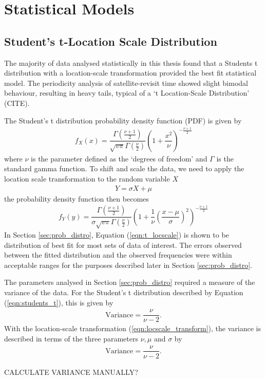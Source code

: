 \chapter{Statistical Models} \label{sec:stats}
\section{Student's t-Location Scale Distribution}
The majority of data analysed statistically in this thesis found that a Students t distribution with a location-scale transformation provided the best fit statistical model. The periodicity analysis of satellite-revisit time showed slight bimodal behaviour, resulting in heavy tails, typical of a `t Location-Scale Distribution' (CITE). 

The Student's t distribution probability density function (PDF) is given by
\begin{align}
	f_X(x) = \dfrac{\Gamma\left(\frac{\nu+ 1}{2}\right)}{\sqrt{v\pi} \Gamma \left(\frac{\nu}{2}\right)} \left( 1 + \dfrac{x^2}{\nu} \right) ^{-\frac{\nu + 1}{2}} \label{eqn:students_t}
\end{align}
where $\nu$ is the parameter defined as the `degrees of freedom' and $\Gamma$ is the standard gamma function. To shift and scale the data, we need to apply the location scale transformation to the random variable $X$
\begin{align}
	Y = \sigma X + \mu \label{eqn:locscale_transform}
\end{align}
the probability density function then becomes 
\begin{align}
	f_Y(y) = \dfrac{\Gamma\left(\frac{\nu+ 1}{2}\right)}{\sigma\sqrt{v\pi} \Gamma \left(\frac{\nu}{2}\right)} \left( 1 + \dfrac{1}{\nu} \left(\dfrac{x - \mu }{\sigma}\right)^2 \right) ^{-\frac{\nu + 1}{2}} \label{eqn:t_locscale}
\end{align}
In Section \ref{sec:prob_distro}, Equation (\ref{eqn:t_locscale}) is shown to be distribution of best fit for most sets of data of interest. The errors observed between the fitted distribution and the observed frequencies were within acceptable ranges for the purposes described later in Section \ref{sec:prob_distro}.

The parameters analysed in Section \ref{sec:prob_distro} required a measure of the variance of the data. For the Student's t distribution described by Equation (\ref{eqn:students_t}), this is given by
\begin{align}
	\text{Variance} = \dfrac{\nu}{\nu-2}.
\end{align}
With the location-scale transformation (\ref{eqn:locscale_transform}), the variance is described in terms of the three parameters $\nu, \mu$ and $\sigma$ by
\begin{align}
	\text{Variance} = \dfrac{\nu}{\nu-2}.
\end{align}

CALCULATE VARIANCE MANUALLY?